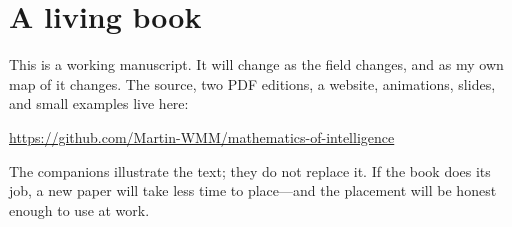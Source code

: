 \section*{A living book}

This is a working manuscript. It will change as the field changes, and as my own map of it changes. The source, two PDF editions, a website, animations, slides, and small examples live here:

\begin{center}
\url{https://github.com/Martin-WMM/mathematics-of-intelligence}
\end{center}

The companions illustrate the text; they do not replace it. If the book does its job, a new paper will take less time to place---and the placement will be honest enough to use at work.
